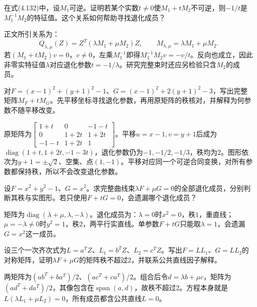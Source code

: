 在式\textup{(4.132)}中，设\(M_1\)可逆。证明若某个实数\(t\ne0\)使\(M_1+tM_2\)不可逆，则\(-1/t\)是\(M_1^{-1}M_2\)的特征值。这个关系如何帮助寻找退化成员？
\par

\par\smallskip\noindent 正文所引关系为：
\begin{equation*}
Q_{\lambda,\mu}(Z)=Z^T(\lambda M_1+\mu M_2)Z,
    \qquad M_{\lambda,\mu}=\lambda M_1+\mu M_2 .
\end{equation*}
\solutionanswer
若\((M_1+tM_2)v=0\)，\(v\ne0\)，左乘\(M_1^{-1}\)即得\(M_1^{-1}M_2v=-v/t\)。反向也成立，因此非零实特征值\(\lambda\)对应退化参数\(t=-1/\lambda\)。研究完整束时还应另检验只含\(M_2\)的成员。


对\(F=(x-1)^2+(y+1)^2-1\)、\(G=(x-1)^2+2(y+1)^2-3\)，写出完整矩阵\(M_F+tM_G\)。先平移坐标寻找退化参数，再用原矩阵的秩核对，并解释为何参数不随平移改变。
\par
\solutionanswer
原矩阵为\(\begin{bmatrix}1+t&0&-1-t\\0&1+2t&1+2t\\-1-t&1+2t&1\end{bmatrix}\)。平移\(u=x-1,v=y+1\)后成为\(\operatorname{diag}(1+t,1+2t,-1-3t)\)，退化参数仍为\(-1,-1/2,-1/3\)，秩均为\(2\)。图形依次为\(y+1=\pm\sqrt2\)、空集、点\((1,-1)\)。平移对应同一个可逆合同变换，对所有参数都保持秩，所以不会改变退化参数。


设\(F=x^2+y^2-1\)、\(G=x^2\)。求完整曲线束\(\lambda F+\mu G=0\)的全部退化成员，分别判断其秩与实图形。若只使用\(F+tG=0\)，会遗漏哪个退化成员？
\par
\solutionanswer
矩阵为\(\operatorname{diag}(\lambda+\mu,\lambda,-\lambda)\)。退化成员为：\(\lambda=0\)时\(x^2=0\)，秩\(1\)，重直线；\(\mu=-\lambda\ne0\)时\(y^2=1\)，秩\(2\)，两平行实直线。单参数\(F+tG\)只能取\(\lambda=1\)，会遗漏\(G=x^2\)这一成员。


设三个一次齐次式为\(L=a^TZ\)、\(L_1=b^TZ\)、\(L_2=c^TZ\)。写出\(F=LL_1\)、\(G=LL_2\)的对称矩阵，证明\(\lambda F+\mu G\)的矩阵秩不超过\(2\)，并联系公共直线因子解释。
\par
\solutionanswer
两矩阵为\((ab^T+ba^T)/2\)、\((ac^T+ca^T)/2\)。组合后令\(d=\lambda b+\mu c\)，矩阵为\((ad^T+da^T)/2\)，其像包含在\(\operatorname{span}(a,d)\)，故秩不超过\(2\)。方程本身就是\(L(\lambda L_1+\mu L_2)=0\)，所有成员都含公共直线\(L=0\)。


